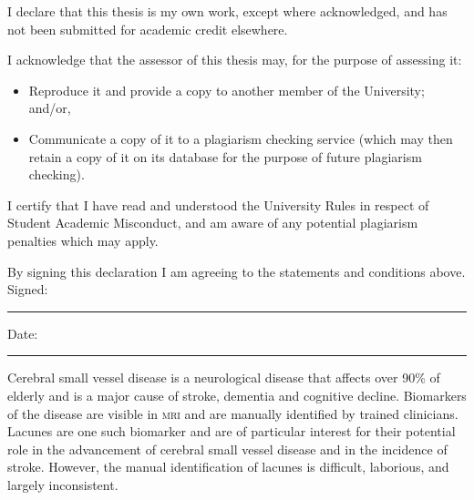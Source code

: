 \beforepreface



\vskip 10pc \noindent I declare that this thesis is my
own work, except where acknowledged, and has not been submitted for
academic credit elsewhere. 

\vskip 2pc  \noindent I acknowledge that the assessor of this
thesis may, for the purpose of assessing it:
\begin{itemize}
\item Reproduce it and provide a copy to another member of the University; and/or,
\item Communicate a copy of it to a plagiarism checking service (which may then retain a copy of it on its database for the purpose of future plagiarism checking).
\end{itemize}

\vskip 2pc \noindent I certify that I have read and understood the University Rules in
respect of Student Academic Misconduct, and am aware of any potential plagiarism penalties which may 
apply.\vspace{24pt}

\vskip 2pc \noindent By signing this declaration I am agreeing to the statements and conditions above.
\vskip 2pc
Signed: \rule{7cm}{0.25pt} \hfill Date: \rule{4cm}{0.25pt}

\afterpage{\blankpage}




%
%
%
%

\afterpage{\blankpage}



Cerebral small vessel disease is a neurological disease that affects over 90\% of elderly and is a major cause of stroke, dementia and cognitive decline. Biomarkers of the disease are visible in \textsc{mri} and are manually identified by trained clinicians. Lacunes are one such biomarker and are of particular interest for their potential role in the advancement of cerebral small vessel disease and in the incidence of stroke. However, the manual identification of lacunes is difficult, laborious, and largely inconsistent.


